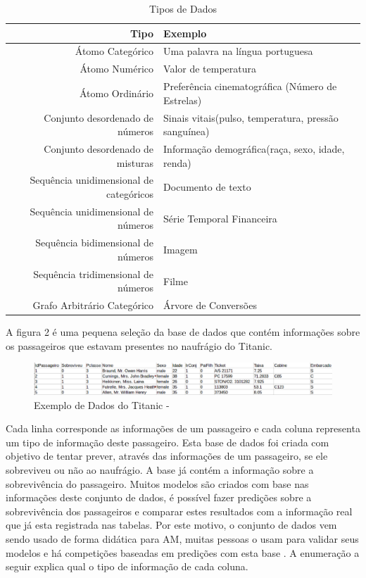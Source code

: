 \begin{table}[h]
\centering
\caption{Tipos de Dados}
\vspace{0.5cm}
\begin{tabular}{r|lr}

\hline 
Tipo & Exemplo  \\ %
\hline                               %
Átomo Categórico        & Uma palavra na língua portuguesa \\
\hline   
Átomo Numérico & Valor de temperatura \\
\hline 
Átomo Ordinário           & Preferência cinematográfica (Número de Estrelas) \\
\hline 
Conjunto desordenado de números       & Sinais vitais(pulso, temperatura, pressão sanguínea)\\
\hline 
Conjunto desordenado de misturas     & Informação demográfica(raça, sexo, idade, renda)\\
\hline 
Sequência unidimensional de categóricos       & Documento de texto\\
\hline 
Sequência unidimensional de números       & Série Temporal Financeira\\
\hline 
Sequência bidimensional de números      & Imagem\\
\hline 
Sequência tridimensional de números       & Filme\\
\hline 
Grafo Arbitrário Categórico       & Árvore de Conversões\\
 \hline 
\end{tabular}
\end{table}

A figura 2 é uma pequena seleção da base de dados que contém informações sobre os passageiros que estavam presentes no naufrágio do Titanic. 

\begin{figure}[!h]
\centering
\includegraphics[keepaspectratio=true,scale=0.40]
{figuras/dataEg.eps}
\caption{Exemplo de Dados do Titanic - \cite{titanic2012}}
\label{data_titatic}
\end{figure}

Cada linha corresponde as informações de um passageiro e cada coluna representa um tipo de informação deste passageiro. Esta base de dados foi criada com objetivo de tentar prever, através das informações de um passageiro, se ele sobreviveu ou não ao naufrágio. A base já contém a informação sobre a sobrevivência do passageiro. Muitos modelos são criados com base nas informações deste conjunto de dados, é possível fazer predições sobre a sobrevivência dos passageiros e comparar estes resultados com a informação real que já esta registrada nas tabelas. Por este motivo, o conjunto de dados vem sendo usado de forma didática para AM, muitas pessoas o usam para validar seus modelos e há competições baseadas em predições com esta base \cite{titanic2011}. A enumeração a seguir explica qual o tipo de informação de cada coluna. 

